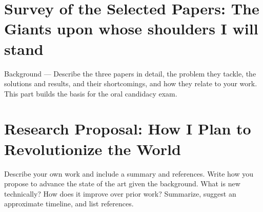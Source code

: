 %





\section{Survey of the Selected Papers: The Giants upon whose shoulders I will stand}
Background --- Describe the three papers in detail, the problem they
tackle, the solutions and results, and their shortcomings, and how they
relate to your work.  This part builds the basis for the oral candidacy exam.

\section{Research Proposal: How I Plan to Revolutionize the World}
Describe your own work and include a  summary and references. Write how you
propose to advance the state of the art given the background. What
is new technically? How does it improve over prior work?
Summarize, suggest an approximate timeline, and list references.

